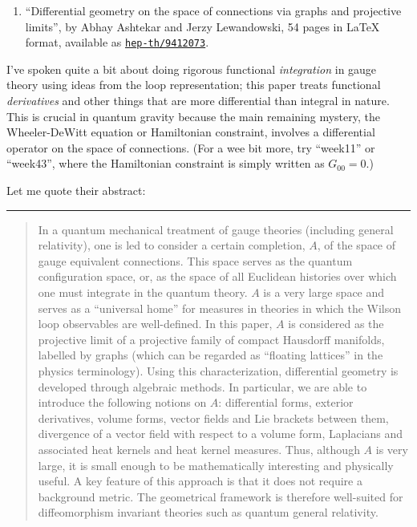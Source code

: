 \documentclass{article}
\def\tightlist{}
\begin{document}
\begin{enumerate}
\def\labelenumi{\arabic{enumi})}
\setcounter{enumi}{4}
\tightlist
\item
  ``Differential geometry on the space of connections via graphs and
  projective limits'', by Abhay Ashtekar and Jerzy Lewandowski, 54 pages
  in LaTeX format, available as
  \href{http://xxx.lanl.gov/abs/hep-th/9412073}{\texttt{hep-th/9412073}}.
\end{enumerate}

I've spoken quite a bit about doing rigorous functional
\emph{integration} in gauge theory using ideas from the loop
representation; this paper treats functional \emph{derivatives} and
other things that are more differential than integral in nature. This is
crucial in quantum gravity because the main remaining mystery, the
Wheeler-DeWitt equation or Hamiltonian constraint, involves a
differential operator on the space of connections. (For a wee bit more,
try ``week11'' or ``week43'', where the Hamiltonian constraint is simply
written as \(G_{00} = 0\).)

Let me quote their abstract:

\begin{center}\rule{0.5\linewidth}{0.5pt}\end{center}

\begin{quote}
In a quantum mechanical treatment of gauge theories (including general
relativity), one is led to consider a certain completion, \(A\), of the
space of gauge equivalent connections. This space serves as the quantum
configuration space, or, as the space of all Euclidean histories over
which one must integrate in the quantum theory. \(A\) is a very large
space and serves as a ``universal home'' for measures in theories in
which the Wilson loop observables are well-defined. In this paper, \(A\)
is considered as the projective limit of a projective family of compact
Hausdorff manifolds, labelled by graphs (which can be regarded as
``floating lattices'' in the physics terminology). Using this
characterization, differential geometry is developed through algebraic
methods. In particular, we are able to introduce the following notions
on \(A\): differential forms, exterior derivatives, volume forms, vector
fields and Lie brackets between them, divergence of a vector field with
respect to a volume form, Laplacians and associated heat kernels and
heat kernel measures. Thus, although \(A\) is very large, it is small
enough to be mathematically interesting and physically useful. A key
feature of this approach is that it does not require a background
metric. The geometrical framework is therefore well-suited for
diffeomorphism invariant theories such as quantum general relativity.
\end{quote}
\end{document}
